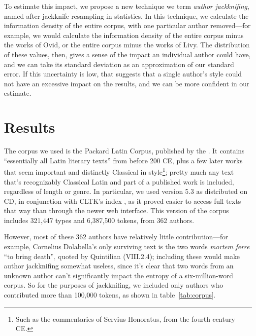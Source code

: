 \documentclass[12pt,twoside]{article}
\begin{document}
To estimate this impact, we propose a new technique we term \emph{author jackknifing}, named after jackknife resampling in statistics. In this technique, we calculate the information density of the entire corpus, with one particular author removed---for example, we would calculate the information density of the entire corpus minus the works of Ovid, or the entire corpus minus the works of Livy. The distribution of these values, then, gives a sense of the impact an individual author could have, and we can take its standard deviation as an approximation of our standard error. If this uncertainty is low, that suggests that a single author's style could not have an excessive impact on the results, and we can be more confident in our estimate.

\section{Results}
\label{sec:res}

The corpus we used is the Packard Latin Corpus, published by the \citet{phi}. It contains ``essentially all Latin literary texts'' from before 200 CE, plus a few later works that seem important and distinctly Classical in style\footnote{Such as the commentaries of Servius Honoratus, from the fourth century CE.}; pretty much any text that's recognizably Classical Latin and part of a published work is included, regardless of length or genre. In particular, we used version 5.3 as distributed on CD, in conjunction with CLTK's index \citep{cltk}, as it proved easier to access full texts that way than through the newer web interface. This version of the corpus includes 321,447 types and 6,387,500 tokens, from 362 authors.

However, most of these 362 authors have relatively little contribution---for example, Cornelius Dolabella's only surviving text is the two words \emph{mortem ferre} ``to bring death'', quoted by Quintilian (VIII.2.4); including these would make author jackknifing somewhat useless, since it's clear that two words from an unknown author can't significantly impact the entropy of a six-million-word corpus. So for the purposes of jackknifing, we included only authors who contributed more than 100,000 tokens, as shown in table~\ref{tab:corpus}.
\end{document}
